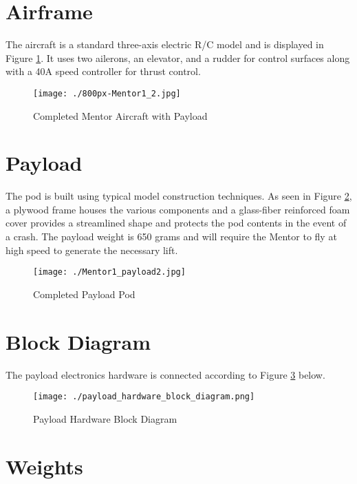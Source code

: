 \documentclass[a4paper,11pt]{report}
\begin{document}
\section{Airframe}

The aircraft is a standard three-axis electric R/C model and is displayed in Figure \ref{fig:mentor}. It uses two ailerons, an elevator, and a rudder for control surfaces along with a 40A speed controller for thrust control.

\begin{figure}[ht]
 \centering
 \texttt{[image: ./800px-Mentor1\_2.jpg]}
 \caption{Completed Mentor Aircraft with Payload}
 \label{fig:mentor}
\end{figure}

\section{Payload}

The pod is built using typical model construction techniques. As seen in Figure \ref{fig:payload}, a plywood frame houses the various components and a glass-fiber reinforced foam cover provides a streamlined shape and protects the pod contents in the event of a crash. The payload weight is 650 grams and will require the Mentor to fly at high speed to generate the necessary lift.

\begin{figure}[ht]
 \centering
 \texttt{[image: ./Mentor1\_payload2.jpg]}
 \caption{Completed Payload Pod}
 \label{fig:payload}
\end{figure}

\section{Block Diagram}

The payload electronics hardware is connected according to Figure \ref{fig:hwdiagram} below.

\begin{figure}[ht]
 \centering
 \texttt{[image: ./payload\_hardware\_block\_diagram.png]}
 \caption{Payload Hardware Block Diagram}
 \label{fig:hwdiagram}
\end{figure}

\section{Weights}
\end{document}
